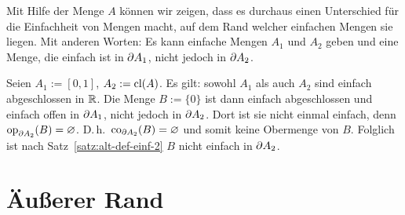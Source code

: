 %    
    \noindent
    Mit
    Hilfe der Menge $A$ können wir zeigen, dass es durchaus einen Unterschied für die Einfachheit von Mengen macht, auf dem Rand welcher einfachen Mengen sie liegen.
    Mit anderen Worten: Es kann einfache Mengen $A_1$ und $A_2$ geben und eine Menge, die einfach ist in $\partial A_1$, nicht jedoch in $\partial A_2$.
%
    \begin{bsp}
         Seien $A_1 := [0,1]$, $A_2 := \text{cl}(A)$.
         Es gilt: sowohl $A_1$ als auch $A_2$ sind einfach abgeschlossen in $\mathbb{R}$. 
         Die Menge $B := \{0\}$ ist dann einfach abgeschlossen und einfach offen in $\partial A_1$, nicht jedoch in $\partial A_2$.
         Dort ist sie nicht einmal einfach, denn $\text{op}_{\partial A_2} (B) = \varnothing$. D.\,h.\ $\text{co}_{\partial A_2}(B) = \varnothing$ und somit keine Obermenge von $B$. Folglich ist nach Satz~\ref{satz:alt-def-einf-2} $B$ nicht einfach in $\partial A_2$.
    \end{bsp}

    
    
\section{Äußerer Rand}\label{sec:aeusserer-rand}

